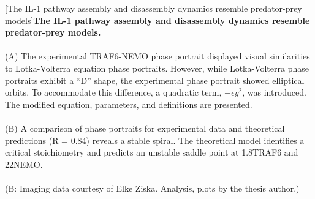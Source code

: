 \begin{centering}
\captionsetup{parbox=none}
[The IL-1 pathway assembly and disassembly dynamics resemble predator-prey models]{\textbf{The IL-1 pathway assembly and disassembly dynamics resemble predator-prey models.}
\\
\\
(A) The experimental TRAF6-NEMO phase portrait displayed visual similarities to Lotka-Volterra equation phase portraits. However, while Lotka-Volterra phase portraits exhibit a “D” shape, the experimental phase portrait showed elliptical orbits. To accommodate this difference, a quadratic term, $-\epsilon y^2$, was introduced. The modified equation, parameters, and definitions are presented.
\\
\\
(B) A comparison of phase portraits for experimental data and theoretical predictions (R = 0.84) reveals a stable spiral. The theoretical model identifies a critical stoichiometry and predicts an unstable saddle point at 1.8\times TRAF6 and 22\times NEMO.
\\
\\
(B: Imaging data courtesy of Elke Ziska. Analysis, plots by the thesis author.)}
\label{p2:7}
\end{centering}


